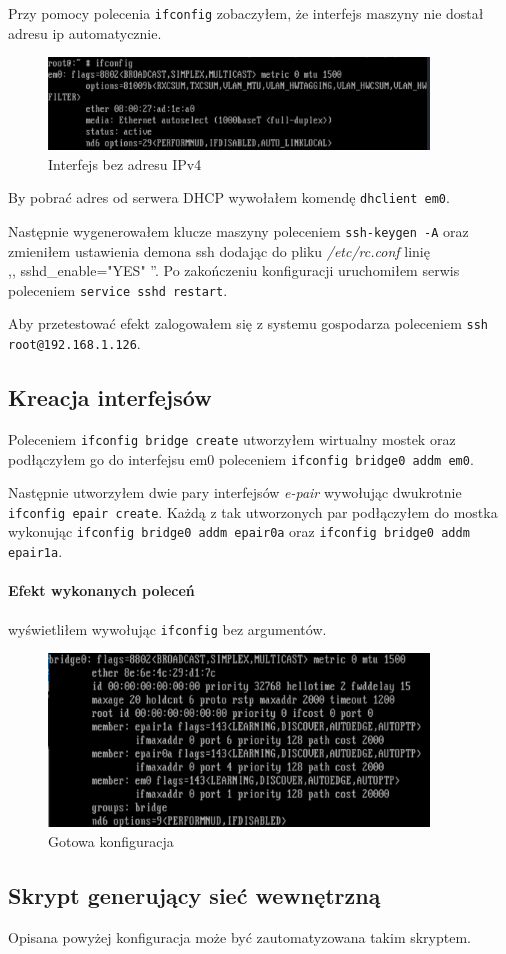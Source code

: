 \documentclass{mwart}
\begin{document}
Przy pomocy polecenia \texttt{ifconfig} zobaczyłem, że interfejs maszyny nie dostał adresu ip automatycznie.

\begin{figure}[H]
  \includegraphics[width=0.90\textwidth]{Interfejs_bez_ip}
  \centering
  \caption{Interfejs bez adresu IPv4}
  \label{fig:if_bez_ip}
\end{figure}

By pobrać adres od serwera DHCP wywołałem komendę \texttt{dhclient em0}.

Następnie wygenerowałem klucze maszyny poleceniem \texttt{ssh-keygen -A} oraz zmieniłem ustawienia demona ssh dodając do pliku \textit{/etc/rc.conf} linię \\ ,, sshd\_enable="YES" ''. Po zakończeniu konfiguracji uruchomiłem serwis poleceniem \texttt{service sshd restart}.

Aby przetestować efekt zalogowałem się z systemu gospodarza poleceniem \texttt{ssh root@192.168.1.126}.

\subsection{Kreacja interfejsów}
Poleceniem \texttt{ifconfig bridge create} utworzyłem wirtualny mostek oraz podłączyłem go do interfejsu em0 poleceniem \texttt{ifconfig bridge0 addm em0}.

Następnie utworzyłem dwie pary interfejsów \textit{e-pair} wywołując dwukrotnie \texttt{ifconfig epair create}. Każdą z tak utworzonych par podłączyłem do mostka wykonując \texttt{ifconfig bridge0 addm epair0a} oraz \texttt{ifconfig bridge0 addm epair1a}.

\paragraph{Efekt wykonanych poleceń} wyświetliłem wywołując \texttt{ifconfig} bez argumentów.

\begin{figure}[H]
  \includegraphics[width=0.90\textwidth]{Podlaczone_interfejsy}
  \centering
  \caption{Gotowa konfiguracja}
  \label{fig:konfiguracja_freebsd}
\end{figure}

\subsection{Skrypt generujący sieć wewnętrzną}
Opisana powyżej konfiguracja może być zautomatyzowana takim skryptem.


\end{document}
